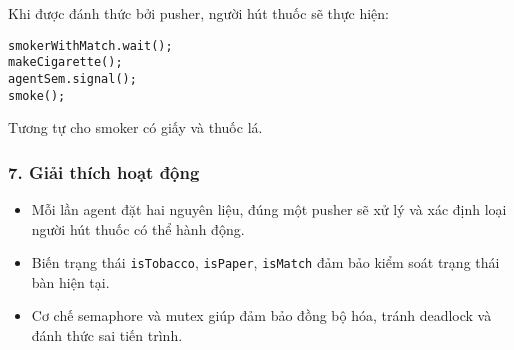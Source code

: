 Khi được đánh thức bởi pusher, người hút thuốc sẽ thực hiện:
\begin{lstlisting}
smokerWithMatch.wait();
makeCigarette();
agentSem.signal();
smoke();
\end{lstlisting}

Tương tự cho smoker có giấy và thuốc lá.

\subsubsection*{7. Giải thích hoạt động}

\begin{itemize}
\item Mỗi lần agent đặt hai nguyên liệu, đúng một pusher sẽ xử lý và xác định loại người hút thuốc có thể hành động.
\item Biến trạng thái \texttt{isTobacco}, \texttt{isPaper}, \texttt{isMatch} đảm bảo kiểm soát trạng thái bàn hiện tại.
\item Cơ chế semaphore và mutex giúp đảm bảo đồng bộ hóa, tránh deadlock và đánh thức sai tiến trình.
\end{itemize}



